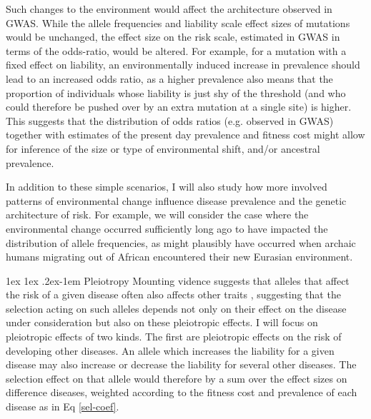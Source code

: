 \documentclass[11pt]{article}
\makeatletter
\renewcommand{\paragraph}{%
  \@startsection{paragraph}{4}%
  {\z@}{1ex \@plus 1ex \@minus .2ex}{-1em}%
  {\normalfont\normalsize\bfseries}%
}
\makeatother
\begin{document}
Such changes to the environment would affect the architecture observed in GWAS. While the allele frequencies and liability scale effect sizes of mutations would be unchanged, the effect size on the risk scale, estimated in GWAS in terms of the odds-ratio, would be altered. For example, for a mutation with a fixed effect on liability, an environmentally induced increase in prevalence should lead to an increased odds ratio, as a higher prevalence also means that the proportion of individuals whose liability is just shy of the threshold (and who could therefore be pushed over by an extra mutation at a single site) is higher. This suggests that the distribution of odds ratios (e.g. observed in GWAS) together with estimates of the present day prevalence and fitness cost might allow for inference of the size or type of environmental shift, and/or ancestral prevalence. 

In addition to these simple scenarios, I will also study how more involved patterns of environmental change influence disease prevalence and the genetic architecture of risk. For example, we will consider the case where the environmental change occurred sufficiently long ago to have impacted the distribution of allele frequencies, as might plausibly have occurred when archaic humans migrating out of African encountered their new Eurasian environment. 



\paragraph{Pleiotropy}
Mounting vidence suggests that alleles that affect the risk of a given disease often also affects other traits \cite{BulikSullivan:2015jf,Pickrell:2016ko, Visscher:2016fp}, suggesting that the selection acting on such alleles depends not only on their effect on the disease under consideration but also on these pleiotropic effects. I will focus on pleiotropic effects of two kinds. The first are pleiotropic effects on the risk of developing other diseases. An allele which increases the liability for a given disease may also increase or decrease the liability for several other diseases. The selection effect on that allele would therefore by a sum over the effect sizes on difference diseases, weighted according to the fitness cost and prevalence of each disease as in Eq \eqref{sel-coef}. 
\end{document}
